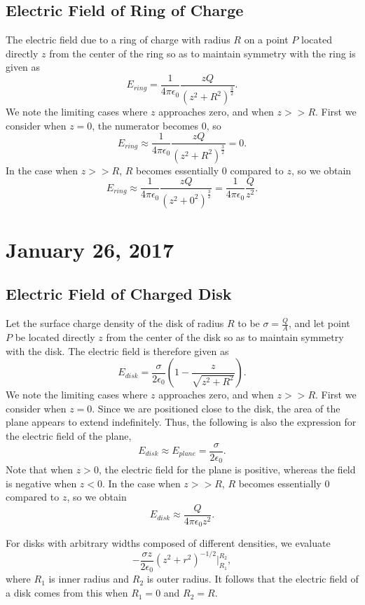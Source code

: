 \documentclass[11pt]{article}
\theoremstyle{plain} %
\theoremstyle{definition}
\theoremstyle{example}
\theoremstyle{remark}
\begin{document}
\subsection{Electric Field of Ring of Charge}
The electric field due to a ring of charge with radius $R$ on a point $P$ located directly $z$ from the center of the ring so as to maintain symmetry with the ring is given as
$$E_{ring} = \frac{1}{4\pi\epsilon_0}\frac{zQ}{\left(z^2+R^2\right)^{\frac{3}{2}}}.$$
We note the limiting cases where $z$ approaches zero, and when $z>>R$. First we consider when $z=0$, the numerator becomes 0, so
$$E_{ring}  \approx \frac{1}{4\pi\epsilon_0}\frac{zQ}{\left(z^2+R^2\right)^{\frac{3}{2}}} = 0.$$
In the case when $z>>R$, $R$ becomes essentially $0$ compared to $z$, so we obtain
$$E_{ring}  \approx \frac{1}{4\pi\epsilon_0}\frac{zQ}{\left(z^2+0^2\right)^{\frac{3}{2}}} = \frac{1}{4\pi\epsilon_0}\frac{Q}{z^2} .$$

\section{January 26, 2017}
\subsection{Electric Field of Charged Disk}
Let the surface charge density of the disk of radius $R$ to be $\sigma = \frac{Q}{A}$, and let point $P$ be located directly $z$ from the center of the disk so as to maintain symmetry with the disk. The electric field is therefore given as 
$$E_{disk} = \frac{\sigma}{2\epsilon_0}\left(1-\frac{z}{\sqrt{z^2+R^2}}\right).$$
We note the limiting cases where $z$ approaches zero, and when $z >> R$. First we consider when $z=0$. Since we are positioned close to the disk, the area of the plane appears to extend indefinitely. Thus, the following is also the expression for the electric field of the plane, 
$$E_{disk} \approx E_{plane} = \frac{\sigma}{2\epsilon_0}.$$
Note that when $z>0$, the electric field for the plane is positive, whereas the field is negative when $z<0$. In the case when $z>>R$, $R$ becomes essentially $0$ compared to $z$, so we obtain
$$E_{disk} \approx \frac{Q}{4\pi\epsilon_0z^2}.$$

For disks with arbitrary widths composed of different densities, we evaluate 
$$-\frac{\sigma z}{2\epsilon_0}\left(z^2+r^2\right)^{-1/2}\Big|_{R_1}^{R_2},$$
where $R_1$ is inner radius and $R_2$ is outer radius. It follows that the electric field of a disk comes from this when $R_1=0$ and $R_2=R$. 
\end{document}
